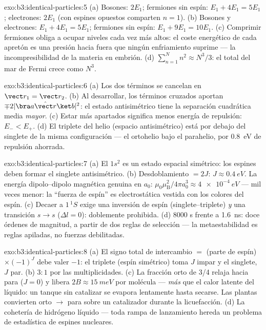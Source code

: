 \begin{solution}{exo:b3:identical-particles:5}
(a) Bosones: $2E_1$; fermiones sin espín: $E_1 + 4E_1 = 5E_1$;
electrones: $2E_1$ (con espines opuestos comparten $n = 1$). (b) Bosones y
electrones: $E_1 + 4E_1 = 5E_1$; fermiones sin espín: $E_1 + 9E_1 =
10E_1$. (c) Comprimir fermiones obliga a ocupar niveles cada vez más
altos: el coste energético de cada apretón es una presión hacia fuera que
ningún enfriamiento suprime --- la incompresibilidad de la materia en
embrión. (d) $\sum_{n=1}^N n^2 \approx N^3/3$: el total del mar de Fermi
crece como $N^3$.
\end{solution}

\begin{solution}{exo:b3:identical-particles:6}
(a) Los dos términos se cancelan en $\vect r_1 = \vect r_2$. (b) Al
desarrollar, los términos cruzados aportan $\mp2|\bra a\hat{\vect r}\ket b|^2$:
el estado antisimétrico tiene la separación cuadrática media \emph{mayor}.
(c) Estar más apartados significa menos energía de repulsión: $E_- <
E_+$. (d) El triplete del helio (espacio antisimétrico) está por debajo del
singlete de la misma configuración --- el ortohelio bajo el parahelio, por
\qty{0.8}{eV} de repulsión ahorrada.
\end{solution}

\begin{solution}{exo:b3:identical-particles:7}
(a) El $1s^2$ es un estado espacial simétrico: los espines deben formar el
singlete antisimétrico. (b) Desdoblamiento $= 2J$: $J \approx
\qty{0.4}{eV}$. La energía dipolo--dipolo magnética genuina en
$a_0$: $\mu_0\mu_{\text{B}}^2/4\pi a_0^3 \approx \qty{4e-4}{eV}$
--- mil veces menor: la ``fuerza de espín'' es electrostática vestida con
los colores del espín. (c) Decaer a $1\,^1S$ exige una inversión de espín
(singlete--triplete) \emph{y} una transición $s \to s$ ($\Delta l =
0$): doblemente prohibida. (d) $8000$ s frente a \qty{1.6}{ns}: doce
órdenes de magnitud, a partir de dos reglas de selección --- la
metaestabilidad es reglas apiladas, no fuerzas debilitadas.
\end{solution}

\begin{solution}{exo:b3:identical-particles:8}
(a) El signo total de intercambio $=$ (parte de espín) $\times (-1)^J$ debe
valer $-1$: el triplete (espín simétrico) toma $J$ impar y el singlete, $J$
par. (b) $3:1$ por las multiplicidades. (c) La fracción orto de 3/4
relaja hacia para ($J = 0$) y libera $2B \approx \qty{15}{meV}$
por molécula --- \emph{más} que el calor latente del líquido:
un tanque sin catalizar se evapora lentamente hasta secarse. Las plantas
convierten orto $\to$ para sobre un catalizador durante la licuefacción. (d)
La cohetería de hidrógeno líquido --- toda rampa de lanzamiento hereda un
problema de estadística de espines nucleares.
\end{solution}

